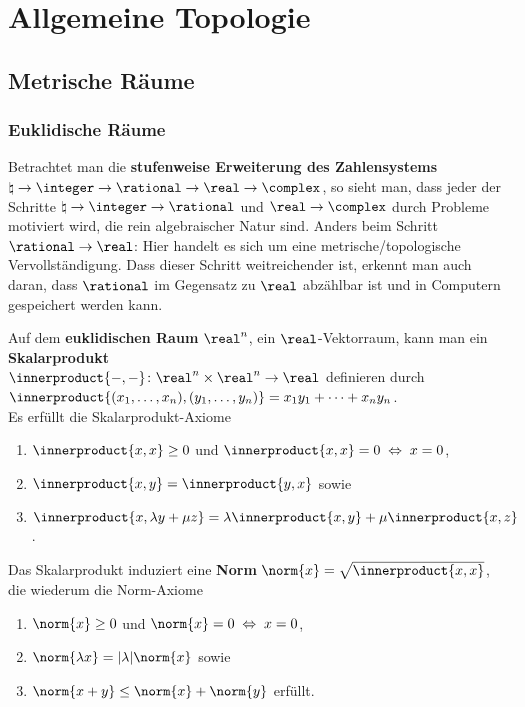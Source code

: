 \chapter{%
    Allgemeine Topologie%
}

\section{%
    Metrische Räume%
}

\subsection{%
    Euklidische Räume%
}

Betrachtet man die \textbf{stufenweise Erweiterung des Zahlensystems}
$\natural \rightarrow \integer \rightarrow \rational \rightarrow
\real \rightarrow \complex$, so sieht man, dass jeder der Schritte
$\natural \rightarrow \integer \rightarrow \rational$ und
$\real \rightarrow \complex$ durch Probleme motiviert wird,
die rein algebraischer Natur sind.
Anders beim Schritt $\rational \rightarrow \real$:
Hier handelt es sich um eine metrische/topologische Vervollständigung.
Dass dieser Schritt weitreichender ist, erkennt man auch daran, dass
$\rational$ im Gegensatz zu $\real$ abzählbar ist und in Computern gespeichert
werden kann.

Auf dem \textbf{euklidischen Raum} $\real^n$, ein $\real$-Vektorraum, kann man
ein \textbf{Skalarprodukt} \\
$\innerproduct{-, -}\colon \real^n \times \real^n \rightarrow \real$
definieren durch $\innerproduct{(x_1, \dotsc, x_n), (y_1, \dotsc, y_n)} =
x_1 y_1 + \dotsb + x_n y_n$. \\
Es erfüllt die Skalarprodukt-Axiome
\begin{enumerate}[label=(S\arabic*)]
    \item
    $\innerproduct{x, x} \ge 0$ und $\innerproduct{x, x} = 0 \;\Leftrightarrow\; x = 0$,

    \item
    $\innerproduct{x, y} = \innerproduct{y, x}$ sowie

    \item
    $\innerproduct{x, \lambda y + \mu z} = \lambda \innerproduct{x, y} + \mu \innerproduct{x, z}$.
\end{enumerate}

Das Skalarprodukt induziert eine \textbf{Norm} $\norm{x} = \sqrt{\innerproduct{x, x}}$,
die wiederum die Norm-Axiome
\begin{enumerate}[label=(N\arabic*)]
    \item
    $\norm{x} \ge 0$ und $\norm{x} = 0 \;\Leftrightarrow\; x = 0$,

    \item
    $\norm{\lambda x} = |\lambda| \norm{x}$ sowie

    \item
    $\norm{x + y} \le \norm{x} + \norm{y}$ erfüllt.
\end{enumerate}

